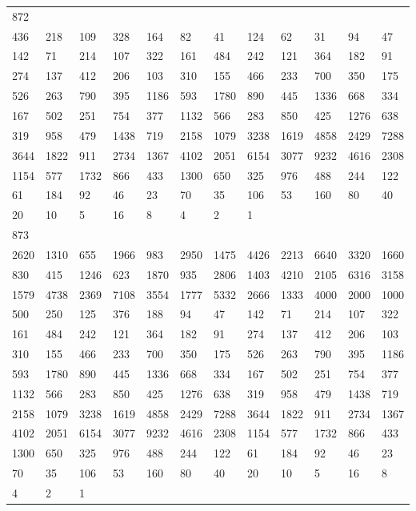 \begin{longtable}{llllllllllll}
872&&&&&&&&&&&\\
436& 218& 109& 328& 164& 82& 41& 124& 62& 31& 94& 47\\
142& 71& 214& 107& 322& 161& 484& 242& 121& 364& 182& 91\\
274& 137& 412& 206& 103& 310& 155& 466& 233& 700& 350& 175\\
526& 263& 790& 395& 1186& 593& 1780& 890& 445& 1336& 668& 334\\
167& 502& 251& 754& 377& 1132& 566& 283& 850& 425& 1276& 638\\
319& 958& 479& 1438& 719& 2158& 1079& 3238& 1619& 4858& 2429& 7288\\
3644& 1822& 911& 2734& 1367& 4102& 2051& 6154& 3077& 9232& 4616& 2308\\
1154& 577& 1732& 866& 433& 1300& 650& 325& 976& 488& 244& 122\\
61& 184& 92& 46& 23& 70& 35& 106& 53& 160& 80& 40\\
20& 10& 5& 16& 8& 4& 2& 1& \\

873&&&&&&&&&&&\\
2620& 1310& 655& 1966& 983& 2950& 1475& 4426& 2213& 6640& 3320& 1660\\
830& 415& 1246& 623& 1870& 935& 2806& 1403& 4210& 2105& 6316& 3158\\
1579& 4738& 2369& 7108& 3554& 1777& 5332& 2666& 1333& 4000& 2000& 1000\\
500& 250& 125& 376& 188& 94& 47& 142& 71& 214& 107& 322\\
161& 484& 242& 121& 364& 182& 91& 274& 137& 412& 206& 103\\
310& 155& 466& 233& 700& 350& 175& 526& 263& 790& 395& 1186\\
593& 1780& 890& 445& 1336& 668& 334& 167& 502& 251& 754& 377\\
1132& 566& 283& 850& 425& 1276& 638& 319& 958& 479& 1438& 719\\
2158& 1079& 3238& 1619& 4858& 2429& 7288& 3644& 1822& 911& 2734& 1367\\
4102& 2051& 6154& 3077& 9232& 4616& 2308& 1154& 577& 1732& 866& 433\\
1300& 650& 325& 976& 488& 244& 122& 61& 184& 92& 46& 23\\
70& 35& 106& 53& 160& 80& 40& 20& 10& 5& 16& 8\\
4& 2& 1& \\


\end{longtable}
